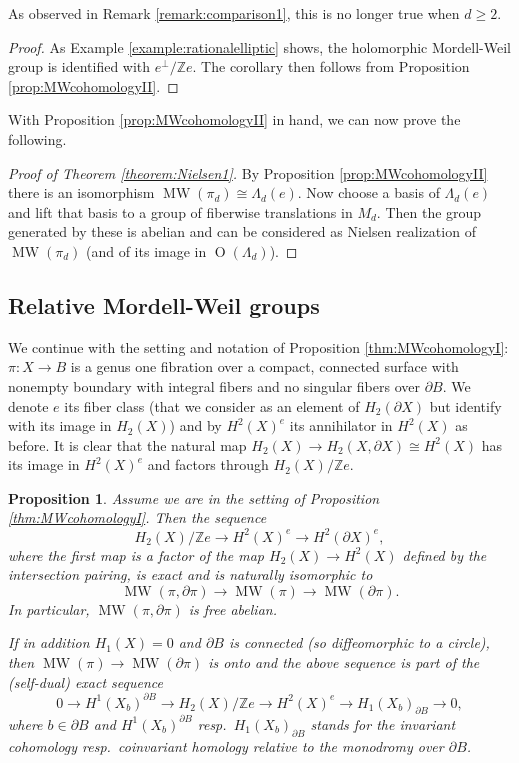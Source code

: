 \documentclass[10pt,letterpaper]{amsart}
\numberwithin{equation}{section}
\def\ZZ{{\mathbb Z}}
\newcommand{\p}{\partial}
\newcommand\MW{\operatorname{MW}}
\newcommand\Orth{\operatorname{O}}
\newtheorem{proposition}[theorem]{Proposition}
\theoremstyle{remark}
\begin{document}
As observed in  Remark \ref{remark:comparison1}, this is no longer true  when $d\ge 2$. 

\begin{proof}
As Example \ref{example:rationalelliptic} shows, the holomorphic Mordell-Weil group is identified with $e ^\perp/\ZZ e$. The corollary then follows from Proposition \ref{prop:MWcohomologyII}.
\end{proof}

With Proposition \ref{prop:MWcohomologyII} in hand, we can now prove the following.

\begin{proof}[Proof of Theorem \ref{theorem:Nielsen1}]  
By Proposition \ref{prop:MWcohomologyII} there is an isomorphism $\MW(\pi_d)\cong \Lambda_d(e)$. Now choose a basis of $\Lambda_d(e)$  
and lift  that basis  to a group of fiberwise translations in $M_d$. Then the group generated by these is abelian and can be considered as  Nielsen realization of $\MW(\pi_d)$ (and of its image in $\Orth(\Lambda_d)$).
\end{proof}




\subsection{Relative Mordell-Weil groups}
\label{subsection:relmw}
We continue with the setting and notation of Proposition \ref{thm:MWcohomologyI}: $\pi:X\to B$ is a genus one fibration over a 
compact, connected surface with nonempty boundary with integral fibers and  no singular fibers over $\p B$. 
We denote $e$ its fiber class (that we consider as an element of $H_2(\p X)$ but identify with its image in $H_2(X)$) and by $H^2(X)^e$ its annihilator in $H^2(X)$ as before.
It is clear that the natural map $H_2(X)\to H_2(X, \p X)\cong H^2(X)$ has its image in $H^2(X)^e$ and factors through $H_2(X)/\ZZ e$. 



\begin{proposition}\label{prop:MWpair}
Assume  we are in the setting of Proposition \ref{thm:MWcohomologyI}. Then the sequence 
\[
 H_2(X)/\ZZ e\to H^2(X)^e\to H^2(\p X)^e,
\]
where the first map  is a factor of the map $H_2(X)\to H^2(X)$ defined by the intersection pairing,  is exact and is naturally isomorphic to 
\begin{equation}\label{eqn:MWsequence}
\MW(\pi,\p\pi)\to \MW(\pi)\to \MW(\p\pi).
\end{equation}
In particular, $\MW(\pi,\p\pi)$ is free abelian. 

If in addition $H_1(X)=0$ and $\p B $ is connected (so diffeomorphic to a circle), then $\MW(\pi)\to \MW(\p\pi)$ is onto and  the above sequence is part of the (self-dual) exact sequence 
\[
0\to H^1(X_b)^{\p B}\to H_2(X)/\ZZ e\to H^2(X)^e\to H_1(X_b)_{\p B}\to 0, 
\]
where $b\in \p B$ and $H^1(X_b)^{\p B}$ resp.\  $H_1(X_b)_{\p B}$ stands for the  invariant cohomology  resp.\ coinvariant homology  relative to  the monodromy over $\p B$. \end{proposition}
\end{document}

